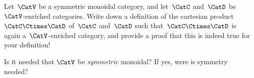 
\begin{gradedexercise}
    \label{ex:ProductOfEnrichedCats}
    Let~$\CatV$ be a symmetric monoidal category, and let~$\CatC$ and~$\CatD$ be~$\CatV$-enriched categories.
    Write down a definition of the cartesian product~$\CatC \Ctimes \CatD$ of~$\CatC$ and~$\CatD$ such that~$\CatC \Ctimes \CatD$ is again a~$\CatV$-enriched category, and provide a proof that this is indeed true for your definition!

    Is it needed that $\CatV$ be \emph{symmetric} monoidal?
    If yes, were is symmetry needed?
\end{gradedexercise}

